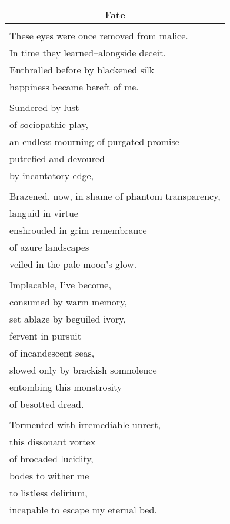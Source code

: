 \documentclass{article}
\begin{document}
\begin{center}
\begin{tabular}{l}
\multicolumn{1}{c}{\textbf{Fate}} \\ \hline
\\
These eyes were once removed from malice. \\
In time they learned--alongside deceit. \\
Enthralled before by blackened silk \\
happiness became bereft of me. \\
\\
Sundered by lust \\
of sociopathic play, \\
an endless mourning of purgated promise \\
putrefied and devoured \\
by incantatory edge, \\
\\
Brazened, now, in shame of phantom transparency, \\
languid in virtue \\
enshrouded in grim remembrance \\
of azure landscapes \\
veiled in the pale moon's glow. \\
\\
Implacable, I've become, \\
consumed by warm memory, \\
set ablaze by beguiled ivory, \\
fervent in pursuit \\
of incandescent seas, \\
slowed only by brackish somnolence \\
entombing this monstrosity \\
of besotted dread. \\
\\
Tormented with irremediable unrest, \\
this dissonant vortex \\
of brocaded lucidity, \\
bodes to wither me \\
to listless delirium, \\
incapable to escape my eternal bed. \\
\end{tabular}
\end{center}
\end{document}
